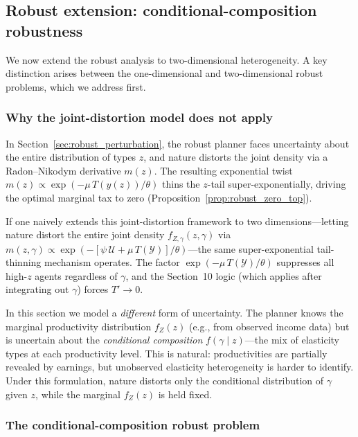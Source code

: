 \documentclass[12pt,a4paper]{article}
\theoremstyle{definition}
\theoremstyle{plain}
\theoremstyle{remark}
\newcommand{\calU}{\mathcal{U}}
\newcommand{\calY}{\mathcal{Y}}
\begin{document}
\subsection{Robust extension: conditional-composition robustness}
\label{sec:2D_robust}

We now extend the robust analysis to two-dimensional heterogeneity.  A key distinction arises between the one-dimensional and two-dimensional robust problems, which we address first.

\subsubsection{Why the joint-distortion model does not apply}
\label{sec:2D_robust_distinction}

In Section~\ref{sec:robust_perturbation}, the robust planner faces uncertainty about the entire distribution of types $z$, and nature distorts the joint density via a Radon--Nikodym derivative $m(z)$.  The resulting exponential twist $m(z) \propto \exp(-\mu\,T(y(z))/\theta)$ thins the $z$-tail super-exponentially, driving the optimal marginal tax to zero (Proposition~\ref{prop:robust_zero_top}).

If one naively extends this joint-distortion framework to two dimensions---letting nature distort the entire joint density $f_{Z,\gamma}(z,\gamma)$ via $m(z,\gamma) \propto \exp(-[\psi\,\calU + \mu\,T(\calY)]/\theta)$---the same super-exponential tail-thinning mechanism operates.  The factor $\exp(-\mu\,T(\calY)/\theta)$ suppresses all high-$z$ agents regardless of $\gamma$, and the Section~10 logic (which applies after integrating out $\gamma$) forces $T' \to 0$.  

In this section we  model a \emph{different} form of uncertainty.  The planner knows the marginal productivity distribution $f_Z(z)$ (e.g., from observed income data) but is uncertain about the \emph{conditional composition} $f(\gamma \mid z)$---the mix of elasticity types at each productivity level.  This is natural: productivities are partially revealed by earnings, but unobserved elasticity heterogeneity is harder to identify.  Under this formulation, nature distorts only the conditional distribution of $\gamma$ given $z$, while the marginal $f_Z(z)$ is held fixed.

\subsubsection{The conditional-composition robust problem}
\end{document}

